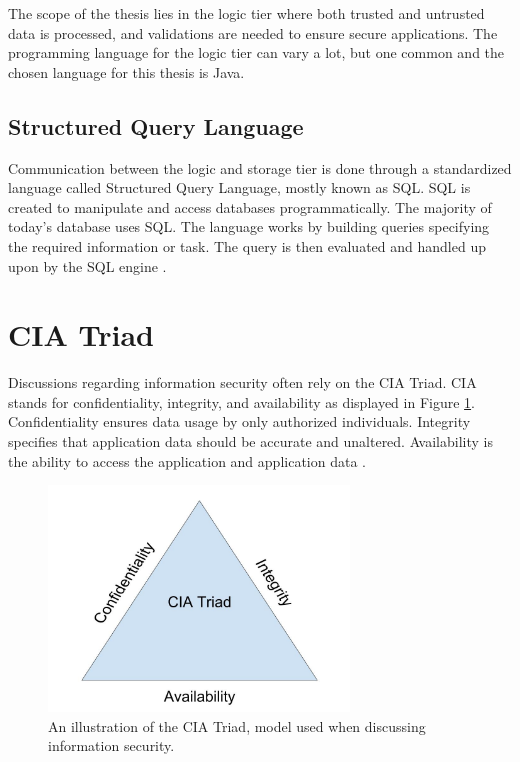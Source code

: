The scope of the thesis lies in the logic tier where both trusted and untrusted data is processed, and validations are needed to ensure secure applications. The programming language for the logic tier can vary a lot, but one common and the chosen language for this thesis is Java.



\subsection{Structured Query Language}
Communication between the logic and storage tier is done through a standardized language called Structured Query Language, mostly known as SQL. SQL is created to manipulate and access databases programmatically. The majority of today's database uses SQL. The language works by building queries specifying the required information or task. The query is then evaluated and handled up upon by the SQL engine \parencite{DarieCristian2003TPGt}.



\section{CIA Triad}
\label{cia}
Discussions regarding information security often rely on the CIA Triad. CIA stands for confidentiality, integrity, and availability as displayed in Figure \ref{fig:CIATriad}. Confidentiality ensures data usage by only authorized individuals. Integrity specifies that application data should be accurate and unaltered. Availability is the ability to access the application and application data \parencite{2014C1-W}.

\begin{figure}[H]
    \centering
    \includegraphics[height=6cm]{images/CIATriad.jpg}
    \caption{An illustration of the CIA Triad, model used when discussing information security.}
    \label{fig:CIATriad}
\end{figure}



